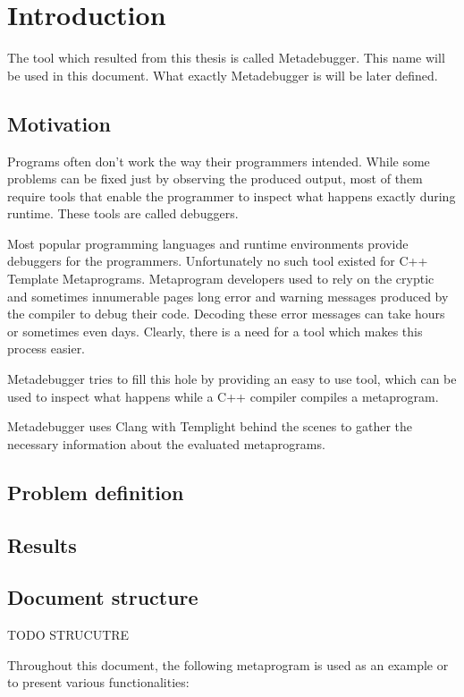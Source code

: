 
\chapter{Introduction}

The tool which resulted from this thesis is called Metadebugger. This name will
be used in this document. What exactly Metadebugger is will be later defined.

\section{Motivation}

Programs often don't work the way their programmers intended. While some
problems can be fixed just by observing the produced output, most of them
require tools that enable the programmer to inspect what happens exactly
during runtime. These tools are called debuggers.

Most popular programming languages and runtime environments provide debuggers
for the programmers. Unfortunately no such tool existed for C++ Template
Metaprograms. Metaprogram developers used to rely on the cryptic and sometimes
innumerable pages long error and warning messages produced by the compiler to
debug their code. Decoding these error messages can take hours or sometimes
even days. Clearly, there is a need for a tool which makes this process easier.

Metadebugger tries to fill this hole by providing an easy to use tool, which
can be used to inspect what happens while a C++ compiler compiles a
metaprogram.

Metadebugger uses Clang with Templight behind the scenes to gather the
necessary information about the evaluated metaprograms.

\section{Problem definition}

\section{Results} %

\section{Document structure} %

TODO STRUCUTRE

Throughout this document, the following metaprogram is used as an example or to
present various functionalities:

